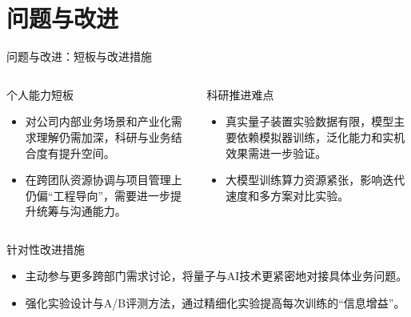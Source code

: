 \documentclass[aspectratio=169]{beamer} %
\begin{document}
\section{问题与改进}
\begin{frame}{问题与改进：短板与改进措施}
    \begin{columns}
        \begin{block}{个人能力短板}
            \begin{itemize}
                \item 对公司内部业务场景和产业化需求理解仍需加深，科研与业务结合度有提升空间。
                \item 在跨团队资源协调与项目管理上仍偏“工程导向”，需要进一步提升统筹与沟通能力。
            \end{itemize}
        \end{block}
        
        \begin{block}{科研推进难点}
            \begin{itemize}
                \item 真实量子装置实验数据有限，模型主要依赖模拟器训练，泛化能力和实机效果需进一步验证。
                \item 大模型训练算力资源紧张，影响迭代速度和多方案对比实验。
            \end{itemize}
        \end{block}
    \end{columns}
    
    \vspace{0.5cm}
    \begin{block}{针对性改进措施}
        \begin{itemize}
            \item 主动参与更多跨部门需求讨论，将量子与AI技术更紧密地对接具体业务问题。
            \item 强化实验设计与A/B评测方法，通过精细化实验提高每次训练的“信息增益”。
        \end{itemize}
    \end{block}
\end{frame}

\end{document}
